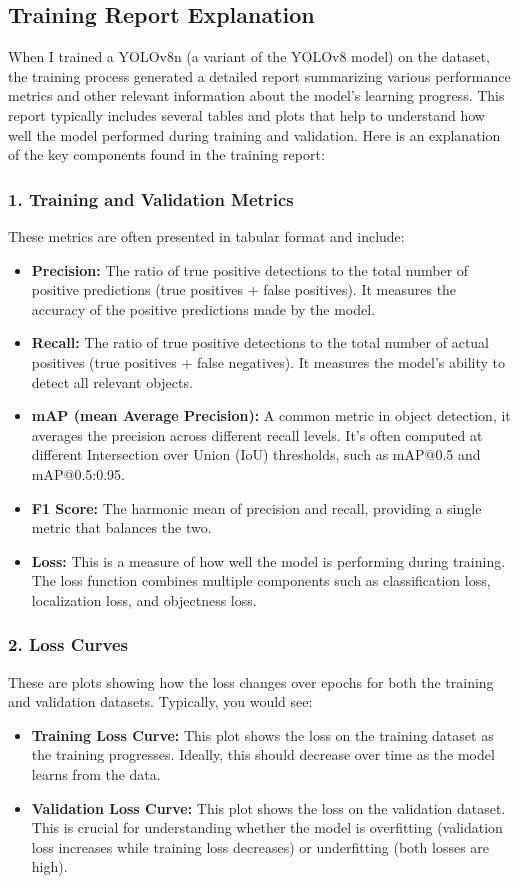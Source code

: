 \documentclass[conference]{IEEEtran}
\begin{document}
\subsection*{Training Report Explanation}

When I trained a YOLOv8n (a variant of the YOLOv8 model) on the dataset, the training process generated a detailed report summarizing various performance metrics and other relevant information about the model's learning progress. This report typically includes several tables and plots that help to understand how well the model performed during training and validation. Here is an explanation of the key components found in the training report:

\subsubsection*{1. Training and Validation Metrics}
These metrics are often presented in tabular format and include:
\begin{itemize}
  \item \textbf{Precision:} The ratio of true positive detections to the total number of positive predictions (true positives + false positives). It measures the accuracy of the positive predictions made by the model.
  \item \textbf{Recall:} The ratio of true positive detections to the total number of actual positives (true positives + false negatives). It measures the model's ability to detect all relevant objects.
  \item \textbf{mAP (mean Average Precision):} A common metric in object detection, it averages the precision across different recall levels. It's often computed at different Intersection over Union (IoU) thresholds, such as mAP@0.5 and mAP@0.5:0.95.
  \item \textbf{F1 Score:} The harmonic mean of precision and recall, providing a single metric that balances the two.
  \item \textbf{Loss:} This is a measure of how well the model is performing during training. The loss function combines multiple components such as classification loss, localization loss, and objectness loss.
\end{itemize}

\subsubsection*{2. Loss Curves}
These are plots showing how the loss changes over epochs for both the training and validation datasets. Typically, you would see:
\begin{itemize}
  \item \textbf{Training Loss Curve:} This plot shows the loss on the training dataset as the training progresses. Ideally, this should decrease over time as the model learns from the data.
  \item \textbf{Validation Loss Curve:} This plot shows the loss on the validation dataset. This is crucial for understanding whether the model is overfitting (validation loss increases while training loss decreases) or underfitting (both losses are high).
\end{itemize}
\end{document}
